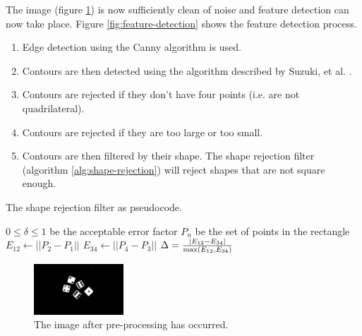 \documentclass[conference]{IEEEtran}
\begin{document}
The image (figure \ref{fig:blurred}) is now sufficiently clean of noise and feature detection can now take place.
Figure \ref{fig:feature-detection} shows the feature detection process.
\begin{enumerate}
	\item Edge detection using the Canny \cite{Canny1986} algorithm is used. %
	\item Contours are then detected using the algorithm described by Suzuki, et al. \cite{Suzuki1985}.
	\item Contours are rejected if they don't have four points (i.e. are not quadrilateral).
	\item Contours are rejected if they are too large or too small.
	\item Contours are then filtered by their shape. The shape rejection filter (algorithm \ref{alg:shape-rejection}) will reject shapes that are not square enough.
\end{enumerate}
\begin{algorithm}
	\caption{The shape rejection filter as pseudocode.}
	\label{alg:shape-rejection}
	\begin{algorithmic}
		\REQUIRE $0 \leq \delta \leq 1$ be the acceptable error factor
		\REQUIRE $P_n$ be the set of points in the rectangle
		\STATE $E_{12} \leftarrow ||P_2 - P_1||$
		\STATE $E_{34} \leftarrow ||P_4 - P_3||$
		\STATE $\Delta = \frac{|E_{12} - E_{34}|}{\textnormal{max}(E_{12}, E_{34})}$
		\IF {$\Delta \leq \delta$} \RETURN \TRUE \ELSE \RETURN \FALSE \ENDIF
	\end{algorithmic}
\end{algorithm}
\begin{figure}
	\centering
	\includegraphics[width=0.3\textwidth]{blur}
	\caption{The image after pre-processing has occurred.}
	\label{fig:blurred}
\end{figure}
%		
%
\end{document}
